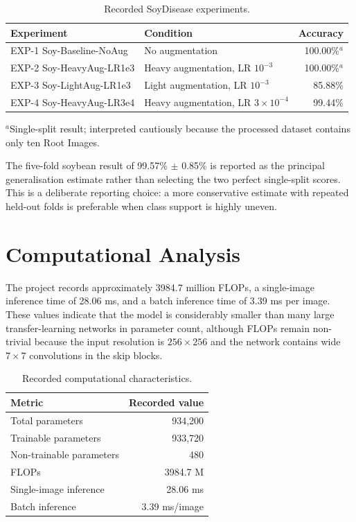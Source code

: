 \documentclass[a4paper,fleqn]{cas-dc}
\begin{document}
\begin{table}[!t]
\centering
\caption{Recorded SoyDisease experiments.}
\label{tab:soy}
\begin{tabular}{p{3.2cm}p{2.8cm}r}
\toprule
Experiment & Condition & Accuracy \\
\midrule
EXP-1 Soy-Baseline-NoAug & No augmentation & 100.00\%$^{a}$ \\
EXP-2 Soy-HeavyAug-LR1e3 & Heavy augmentation, LR $10^{-3}$ & 100.00\%$^{a}$ \\
EXP-3 Soy-LightAug-LR1e3 & Light augmentation, LR $10^{-3}$ & 85.88\% \\
EXP-4 Soy-HeavyAug-LR3e4 & Heavy augmentation, LR $3\times10^{-4}$ & 99.44\% \\
\bottomrule
\end{tabular}
\par\smallskip
\raggedright\footnotesize $^{a}$Single-split result; interpreted cautiously because the processed dataset contains only ten Root Images.
\end{table}

The five-fold soybean result of 99.57\% $\pm$ 0.85\% is reported as the principal generalisation estimate rather than selecting the two perfect single-split scores. This is a deliberate reporting choice: a more conservative estimate with repeated held-out folds is preferable when class support is highly uneven.

\section{Computational Analysis}
The project records approximately 3984.7 million FLOPs, a single-image inference time of 28.06 ms, and a batch inference time of 3.39 ms per image. These values indicate that the model is considerably smaller than many large transfer-learning networks in parameter count, although FLOPs remain non-trivial because the input resolution is $256\times256$ and the network contains wide $7\times7$ convolutions in the skip blocks.

\begin{table}[!t]
\centering
\caption{Recorded computational characteristics.}
\label{tab:complexity}
\begin{tabular}{p{4.0cm}r}
\toprule
Metric & Recorded value \\
\midrule
Total parameters & 934,200 \\
Trainable parameters & 933,720 \\
Non-trainable parameters & 480 \\
FLOPs & 3984.7 M \\
Single-image inference & 28.06 ms \\
Batch inference & 3.39 ms/image \\
\bottomrule
\end{tabular}
\end{table}
\end{document}
